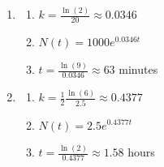 \begin{multicols}{2}
\begin{enumerate}
\setcounter{enumi}{\value{HW}}

\item  \begin{enumerate} \item  $k = \frac{\ln(2)}{20} \approx 0.0346$

\item  $N(t) = 1000e^{0.0346 t}$

\item  $t = \frac{\ln(9)}{0.0346} \approx 63$ minutes

\end{enumerate}

\item  \begin{enumerate} \item  $k = \frac{1}{2}\frac{\ln(6)}{2.5} \approx 0.4377$

\item  $N(t) = 2.5e^{0.4377 t}$

\item  $t = \frac{\ln(2)}{0.4377} \approx 1.58$ hours

\end{enumerate}

\setcounter{HW}{\value{enumi}}
\end{enumerate}
\end{multicols}

